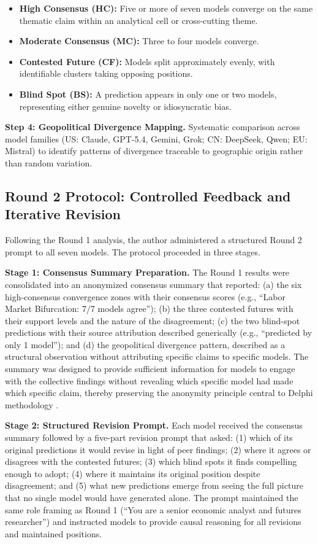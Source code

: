 \documentclass[preprint,review,12pt]{elsarticle}
\begin{document}
\begin{itemize}
  \item \textbf{High Consensus (HC):} Five or more of seven models converge on the same thematic claim within an analytical cell or cross-cutting theme.
  \item \textbf{Moderate Consensus (MC):} Three to four models converge.
  \item \textbf{Contested Future (CF):} Models split approximately evenly, with identifiable clusters taking opposing positions.
  \item \textbf{Blind Spot (BS):} A prediction appears in only one or two models, representing either genuine novelty or idiosyncratic bias.

\end{itemize}
\textbf{Step 4: Geopolitical Divergence Mapping.} Systematic comparison across model families (US: Claude, GPT-5.4, Gemini, Grok; CN: DeepSeek, Qwen; EU: Mistral) to identify patterns of divergence traceable to geographic origin rather than random variation.


\subsection{Round 2 Protocol: Controlled Feedback and Iterative Revision}
\label{sec:round2_protocol}

Following the Round 1 analysis, the author administered a structured Round 2 prompt to all seven models. The protocol proceeded in three stages.

\textbf{Stage 1: Consensus Summary Preparation.} The Round 1 results were consolidated into an anonymized consensus summary that reported: (a) the six high-consensus convergence zones with their consensus scores (e.g., ``Labor Market Bifurcation: 7/7 models agree''); (b) the three contested futures with their support levels and the nature of the disagreement; (c) the two blind-spot predictions with their source attribution described generically (e.g., ``predicted by only 1 model''); and (d) the geopolitical divergence pattern, described as a structural observation without attributing specific claims to specific models. The summary was designed to provide sufficient information for models to engage with the collective findings without revealing which specific model had made which specific claim, thereby preserving the anonymity principle central to Delphi methodology \citep{vondergracht2012delphi}.

\textbf{Stage 2: Structured Revision Prompt.} Each model received the consensus summary followed by a five-part revision prompt that asked: (1) which of its original predictions it would revise in light of peer findings; (2) where it agrees or disagrees with the contested futures; (3) which blind spots it finds compelling enough to adopt; (4) where it maintains its original position despite disagreement; and (5) what new predictions emerge from seeing the full picture that no single model would have generated alone. The prompt maintained the same role framing as Round 1 (``You are a senior economic analyst and futures researcher'') and instructed models to provide causal reasoning for all revisions and maintained positions.
\end{document}
